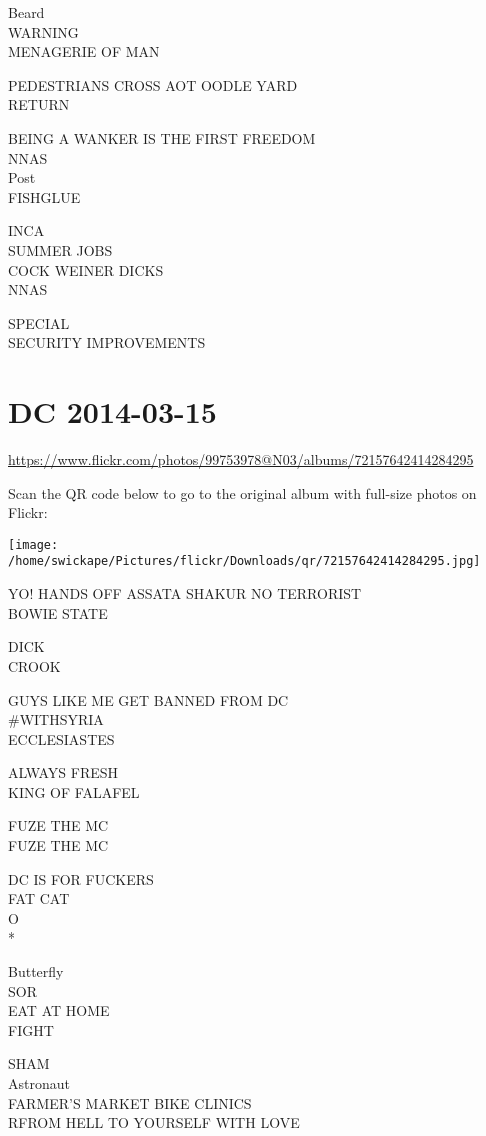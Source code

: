 \documentclass[10pt,letterpaper]{article}
\begin{document}
Beard\\
WARNING\\
MENAGERIE OF MAN

PEDESTRIANS CROSS AOT OODLE YARD\\
RETURN

BEING A WANKER IS THE FIRST FREEDOM\\
NNAS\\
Post\\
FISHGLUE

INCA\\
SUMMER JOBS\\
COCK WEINER DICKS\\
NNAS

SPECIAL\\
SECURITY IMPROVEMENTS
\pagebreak

\section*{DC 2014-03-15}

\url{https://www.flickr.com/photos/99753978@N03/albums/72157642414284295}

Scan the QR code below to go to the original album with full-size photos on Flickr:

\texttt{[image: /home/swickape/Pictures/flickr/Downloads/qr/72157642414284295.jpg]}
\pagebreak

YO!  HANDS OFF ASSATA SHAKUR NO TERRORIST\\
BOWIE STATE

DICK\\
CROOK

GUYS LIKE ME GET BANNED FROM DC\\
\#WITHSYRIA\\
ECCLESIASTES

ALWAYS FRESH\\
KING OF FALAFEL

FUZE THE MC\\
FUZE THE MC

DC IS FOR FUCKERS\\
FAT CAT\\
O\\
*

Butterfly\\
SOR\\
EAT AT HOME\\
FIGHT

SHAM\\
Astronaut\\
FARMER'S MARKET BIKE CLINICS\\
RFROM HELL TO YOURSELF WITH LOVE
\end{document}
